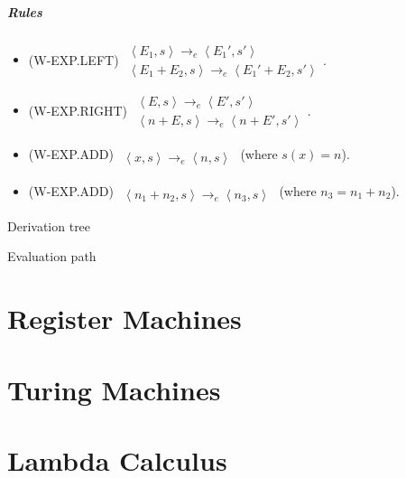 \documentclass[twocolumn,english]{article}
\begin{document}
\subparagraph{Rules}
\begin{itemize}
\item {\scriptsize{}(W-EXP.LEFT)} $\begin{array}{c}
\left\langle E_{1},s\right\rangle \rightarrow_{e}\left\langle E_{1}',s'\right\rangle \\
\hline \left\langle E_{1}+E_{2},s\right\rangle \rightarrow_{e}\left\langle E_{1}'+E_{2},s'\right\rangle 
\end{array}$.
\item {\scriptsize{}(W-EXP.RIGHT)} $\begin{array}{c}
\left\langle E,s\right\rangle \rightarrow_{e}\left\langle E',s'\right\rangle \\
\hline \left\langle n+E,s\right\rangle \rightarrow_{e}\left\langle n+E',s'\right\rangle 
\end{array}$.
\item {\scriptsize{}(W-EXP.ADD)} $\begin{array}{c}
\\
\hline \left\langle x,s\right\rangle \rightarrow_{e}\left\langle n,s\right\rangle 
\end{array}$ (where $s(x)=n$).
\item {\scriptsize{}(W-EXP.ADD)} $\begin{array}{c}
\\
\hline \left\langle n_{1}+n_{2},s\right\rangle \rightarrow_{e}\left\langle n_{3},s\right\rangle 
\end{array}$ (where $n_{3}=n_{1}+n_{2}$).
\end{itemize}
Derivation tree

Evaluation path

\section{Register Machines}

\section{Turing Machines}

\section{Lambda Calculus}
\end{document}
